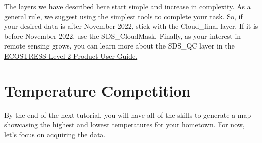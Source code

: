 \documentclass[oneside,a4paper,11pt,explicit]{book}
\begin{document}
	\vspace{.5em}
	
	The layers we have described here start simple and increase in complexity. As a general rule, we suggest using the simplest tools to complete your task. So, if your desired data is after November 2022, stick with the Cloud\_final layer. If it is before November 2022, use the SDS\_CloudMask. Finally, as your interest in remote sensing grows, you can learn more about the SDS\_QC layer in the \href{https://lpdaac.usgs.gov/documents/423/ECO2_User_Guide_V1.pdf}{ECOSTRESS Level 2 Product User Guide.}
	
	\section{Temperature Competition}
	
	By the end of the next tutorial, you will have all of the skills to generate a map showcasing the highest and lowest temperatures for your hometown. For now, let's focus on acquiring the data.
	
\end{document}
